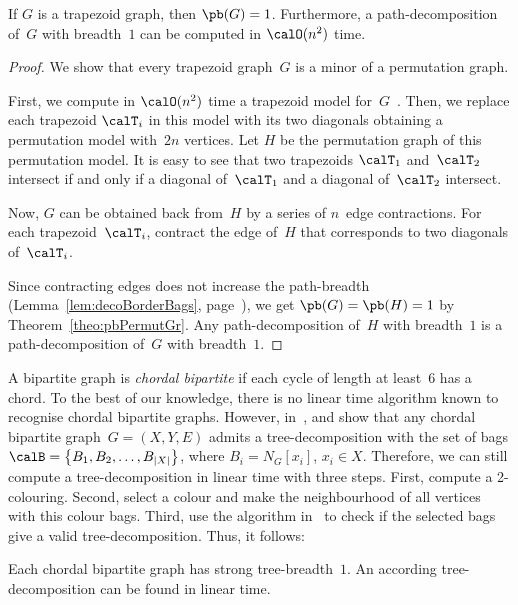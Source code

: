 \begin{theorem}
    \label{theo:pbTrapGr}
If \( G \) is a trapezoid graph, then \( \pb(G) = 1 \).
Furthermore, a path-decomposition of~\( G \) with breadth~\( 1 \) can be computed in \( \calO(n^2) \) time.
\end{theorem}

\begin{proof}
We show that every trapezoid graph~$G$ is a minor of a permutation graph.

First, we compute in $\calO(n^2)$ time a trapezoid model for~$G$~\cite{MaSpinra1994}.
Then, we replace each trapezoid $\calT_i$ in this model with its two diagonals obtaining a permutation model with~$2 n$ vertices.
Let $H$ be the permutation graph of this permutation model.
It is easy to see that two trapezoids $\calT_1$ and~$\calT_2$ intersect if and only if a diagonal of~$\calT_1$ and a diagonal of~$\calT_2$ intersect.

Now, $G$ can be obtained back from~$H$ by a series of $n$~edge contractions.
For each trapezoid~$\calT_i$, contract the edge of~$H$ that corresponds to two diagonals of~$\calT_i$.

Since contracting edges does not increase the path-breadth (Lemma~\ref{lem:decoBorderBags}, page~\pageref{lem:decoBorderBags}), we get $\pb(G) = \pb(H) = 1$ by Theorem~\ref{theo:pbPermutGr}.
Any path-decomposition of~$H$ with breadth~$1$ is a path-decomposition of~$G$ with breadth~$1$.
\end{proof}

A bipartite graph is \emph{chordal bipartite} if each cycle of length at least~$6$ has a chord.
To the best of our knowledge, there is no linear time algorithm known to recognise chordal bipartite graphs.
However, in~\cite{DraganLomono2007},  and  show that any chordal bipartite graph~$G = (X, Y, E)$ admits a tree-decomposition with the set of bags $\calB = \big \{ B_1, B_2 , \ldots, B_{|X|} \big \}$, where $B_i = N_G[x_i]$, $x_i \in X$.
Therefore, we can still compute a tree-decomposition in linear time with three steps.
First, compute a 2-colouring.
Second, select a colour and make the neighbourhood of all vertices with this colour bags.
Third, use the algorithm in~\cite{TarjanYannak1984} to check if the selected bags give a valid tree-decomposition.
Thus, it follows:

\begin{theorem}
Each chordal bipartite graph has strong tree-breadth~\( 1 \).
An according tree-decomposition can be found in linear time.
\end{theorem}

